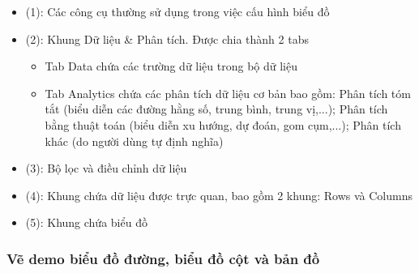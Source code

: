 \documentclass[a4paper, 12pt]{article}
\begin{document}
\begin{itemize}
    \begin{itemize}
        \item (1): Các công cụ thường sử dụng trong việc cấu hình biểu đồ
        \item (2): Khung Dữ liệu \& Phân tích. Được chia thành 2 tabs
        \begin{itemize}
            \item Tab Data chứa các trường dữ liệu trong bộ dữ liệu
            \item Tab Analytics chứa các phân tích dữ liệu cơ bản bao gồm: Phân tích tóm tắt (biểu diễn các đường hằng số, trung bình, trung vị,...); Phân tích bằng thuật toán (biểu diễn xu hướng, dự đoán, gom cụm,...); Phân tích khác (do người dùng tự định nghĩa)
        \end{itemize}

        \item (3): Bộ lọc và điều chỉnh dữ liệu
        \item (4): Khung chứa dữ liệu được trực quan, bao gồm 2 khung: Rows và Columns
        \item (5): Khung chứa biểu đồ
    \end{itemize}
\end{itemize}

\subsubsection{Vẽ demo biểu đồ đường, biểu đồ cột và bản đồ}
\end{document}
